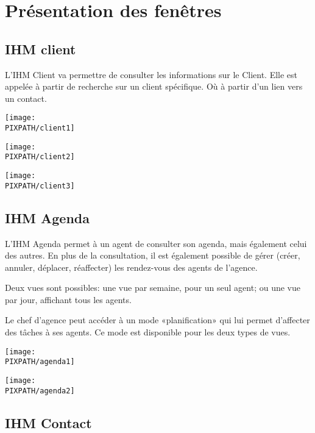 \section{Présentation des fenêtres}

\subsection{IHM client}

L'IHM Client va permettre de consulter les informations sur le Client.
Elle est appelée à partir de recherche sur un client spécifique. Où à partir d'un lien vers un contact.


\begin{center}
\texttt{[image: \\PIXPATH/client1]}
\end{center}
\begin{center}
\texttt{[image: \\PIXPATH/client2]}
\end{center}
\begin{center}
\texttt{[image: \\PIXPATH/client3]}
\end{center}

\subsection{IHM Agenda}

L'IHM Agenda permet à un agent de consulter son agenda, mais également
celui des autres. En plus de la consultation, il est également possible
de gérer (créer, annuler, déplacer, réaffecter) les rendez-vous des
agents de l'agence.

Deux vues sont possibles: une vue par semaine, pour un seul agent; ou
une vue par jour, affichant tous les agents.

Le chef d'agence peut accéder à un mode «planification» qui lui permet
d'affecter des tâches à ses agents. Ce mode est disponible pour les
deux types de vues.
\begin{center}
\texttt{[image: \\PIXPATH/agenda1]}
\end{center}

\begin{center}
\texttt{[image: \\PIXPATH/agenda2]}
\end{center}

\subsection{IHM Contact}


